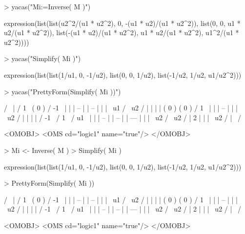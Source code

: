 \documentclass[10pt]{article}
\begin{document}
\begin{Schunk}
\begin{Sinput}
> yacas("Mi:=Inverse( M )")
\end{Sinput}
\begin{Soutput}
expression(list(list(u2^2/(u1 * u2^2), 0, -(u1 * u2)/(u1 * u2^2)), 
    list(0, 0, u1 * u2/(u1 * u2^2)), list(-(u1 * u2)/(u1 * u2^2), 
        u1 * u2/(u1 * u2^2), u1^2/(u1 * u2^2))))
\end{Soutput}
\begin{Sinput}
> yacas("Simplify( Mi )")
\end{Sinput}
\begin{Soutput}
expression(list(list(1/u1, 0, -1/u2), list(0, 0, 1/u2), list(-1/u2, 
    1/u2, u1/u2^2)))
\end{Soutput}
\begin{Sinput}
> yacas("PrettyForm(Simplify( Mi ))")
\end{Sinput}
\begin{Soutput}
/                        \
| / 1  \ ( 0 )  / -1 \   |
| | -- |        | -- |   |
| \ u1 /        \ u2 /   |
|                        |
| ( 0 )  ( 0 )  / 1  \   |
|               | -- |   |
|               \ u2 /   |
|                        |
| / -1 \ / 1  \ / u1  \  |
| | -- | | -- | | --- |  |
| \ u2 / \ u2 / |   2 |  |
|               \ u2  /  |
\                        /

<OMOBJ>
  <OMS cd="logic1" name="true"/>
</OMOBJ>
\end{Soutput}
\end{Schunk}


\begin{Schunk}
\begin{Sinput}
> Mi <- Inverse( M )
> Simplify( Mi )
\end{Sinput}
\begin{Soutput}
expression(list(list(1/u1, 0, -1/u2), list(0, 0, 1/u2), list(-1/u2, 
    1/u2, u1/u2^2)))
\end{Soutput}
\begin{Sinput}
> PrettyForm(Simplify( Mi ))
\end{Sinput}
\begin{Soutput}
/                        \
| / 1  \ ( 0 )  / -1 \   |
| | -- |        | -- |   |
| \ u1 /        \ u2 /   |
|                        |
| ( 0 )  ( 0 )  / 1  \   |
|               | -- |   |
|               \ u2 /   |
|                        |
| / -1 \ / 1  \ / u1  \  |
| | -- | | -- | | --- |  |
| \ u2 / \ u2 / |   2 |  |
|               \ u2  /  |
\                        /

<OMOBJ>
  <OMS cd="logic1" name="true"/>
</OMOBJ>
\end{Soutput}
\end{Schunk}
\end{document}
